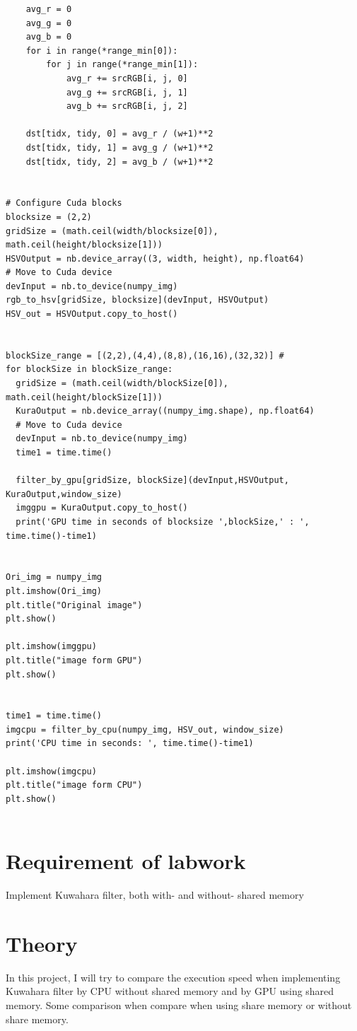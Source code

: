 \documentclass{article}
\begin{document}
\begin{verbatim}
    avg_r = 0
    avg_g = 0
    avg_b = 0
    for i in range(*range_min[0]):
        for j in range(*range_min[1]):
            avg_r += srcRGB[i, j, 0]
            avg_g += srcRGB[i, j, 1]
            avg_b += srcRGB[i, j, 2]

    dst[tidx, tidy, 0] = avg_r / (w+1)**2
    dst[tidx, tidy, 1] = avg_g / (w+1)**2
    dst[tidx, tidy, 2] = avg_b / (w+1)**2


# Configure Cuda blocks
blocksize = (2,2)
gridSize = (math.ceil(width/blocksize[0]), math.ceil(height/blocksize[1]))
HSVOutput = nb.device_array((3, width, height), np.float64)
# Move to Cuda device
devInput = nb.to_device(numpy_img)
rgb_to_hsv[gridSize, blocksize](devInput, HSVOutput)
HSV_out = HSVOutput.copy_to_host()


blockSize_range = [(2,2),(4,4),(8,8),(16,16),(32,32)] #
for blockSize in blockSize_range:
  gridSize = (math.ceil(width/blockSize[0]), math.ceil(height/blockSize[1]))
  KuraOutput = nb.device_array((numpy_img.shape), np.float64)
  # Move to Cuda device
  devInput = nb.to_device(numpy_img)
  time1 = time.time()

  filter_by_gpu[gridSize, blockSize](devInput,HSVOutput, KuraOutput,window_size)
  imggpu = KuraOutput.copy_to_host()
  print('GPU time in seconds of blocksize ',blockSize,' : ', time.time()-time1)


Ori_img = numpy_img
plt.imshow(Ori_img)
plt.title("Original image") 
plt.show()

plt.imshow(imggpu)
plt.title("image form GPU") 
plt.show()


time1 = time.time()
imgcpu = filter_by_cpu(numpy_img, HSV_out, window_size)
print('CPU time in seconds: ', time.time()-time1)

plt.imshow(imgcpu)
plt.title("image form CPU") 
plt.show()


\end{verbatim}

\section{Requirement of labwork}
Implement Kuwahara filter, both with- and without- shared memory

\section{Theory}
In this project, I will try to compare the execution speed when implementing Kuwahara filter by CPU without shared memory and by GPU using shared memory. Some comparison when compare when using share memory or without share memory.
\end{document}
